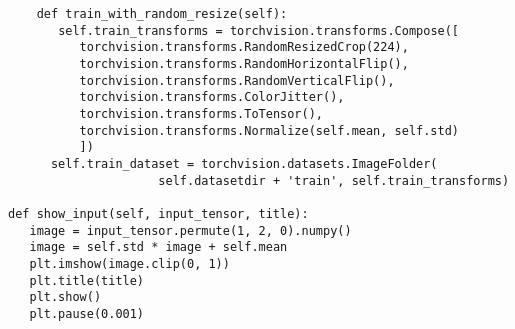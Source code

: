 \begin{verbatim}
    def train_with_random_resize(self):
       self.train_transforms = torchvision.transforms.Compose([
          torchvision.transforms.RandomResizedCrop(224),
          torchvision.transforms.RandomHorizontalFlip(),
          torchvision.transforms.RandomVerticalFlip(),
          torchvision.transforms.ColorJitter(),
          torchvision.transforms.ToTensor(),
          torchvision.transforms.Normalize(self.mean, self.std)
          ])
      self.train_dataset = torchvision.datasets.ImageFolder(
                     self.datasetdir + 'train', self.train_transforms)

def show_input(self, input_tensor, title):
   image = input_tensor.permute(1, 2, 0).numpy()
   image = self.std * image + self.mean
   plt.imshow(image.clip(0, 1))
   plt.title(title)
   plt.show()
   plt.pause(0.001)
\end{verbatim}

